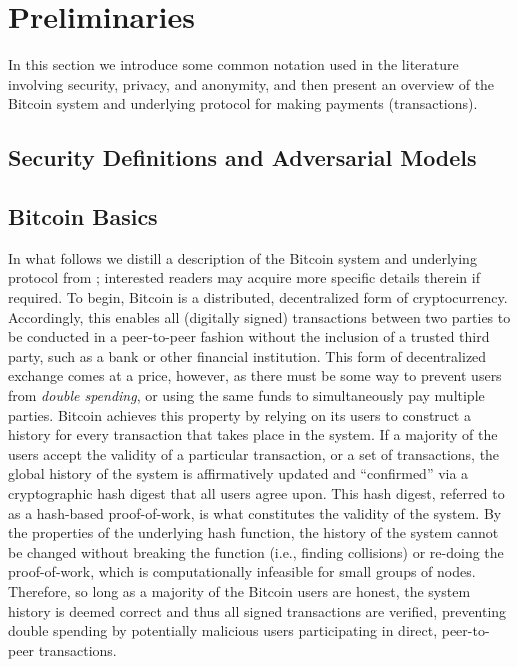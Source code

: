 \section{Preliminaries}

In this section we introduce some common notation used in the literature involving security, privacy, and anonymity, and then present an overview of the Bitcoin system and underlying protocol for making payments (transactions). 

\subsection{Security Definitions and Adversarial Models}


\subsection{Bitcoin Basics}

In what follows we distill a description of the Bitcoin system and underlying protocol from \cite{bitcoin}; interested readers may acquire more specific details therein if required. To begin, Bitcoin is a distributed, decentralized form of cryptocurrency. Accordingly, this enables all (digitally signed) transactions between two parties to be conducted in a peer-to-peer fashion without the inclusion of a trusted third party, such as a bank or other financial institution. This form of decentralized exchange comes at a price, however, as there must be some way to prevent users from \emph{double spending}, or using the same funds to simultaneously pay multiple parties. Bitcoin achieves this property by relying on its users to construct a history for every transaction that takes place in the system. If a majority of the users accept the validity of a particular transaction, or a set of transactions, the global history of the system is affirmatively updated and ``confirmed'' via a cryptographic hash digest that all users agree upon. This hash digest, referred to as a hash-based proof-of-work, is what constitutes the validity of the system. By the properties of the underlying hash function, the history of the system cannot be changed without breaking the function (i.e., finding collisions) or re-doing the proof-of-work, which is computationally infeasible for small groups of nodes. Therefore, so long as a majority of the Bitcoin users are honest, the system history is deemed correct and thus all signed transactions are verified, preventing double spending by potentially malicious users participating in direct, peer-to-peer transactions. 

